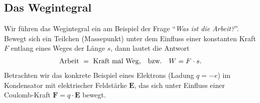 \subsection{Das Wegintegral}

Wir führen das Wegintegral ein am Beispiel der Frage ``\emph{Was ist die Arbeit?}''. Bewegt sich ein Teilchen (Massepunkt) unter dem Einfluss einer konstanten Kraft $F$ entlang eines Weges der Länge $s$, dann lautet die Antwort 
\begin{align}
    \text{Arbeit } = \text{ Kraft mal Weg,} \qq{bzw.} W = F\cdot s.
\end{align}
Betrachten wir das konkrete Beispiel eines Elektrons (Ladung $q = -e$) im Kondensator mit elektrischer Feldstärke $\bm{E}$, das sich unter Einfluss einer Coulomb-Kraft $\bm{F} = q \cdot \bm{E}$ bewegt. 
\begin{figure}[htp]
    \centering
\end{figure}

